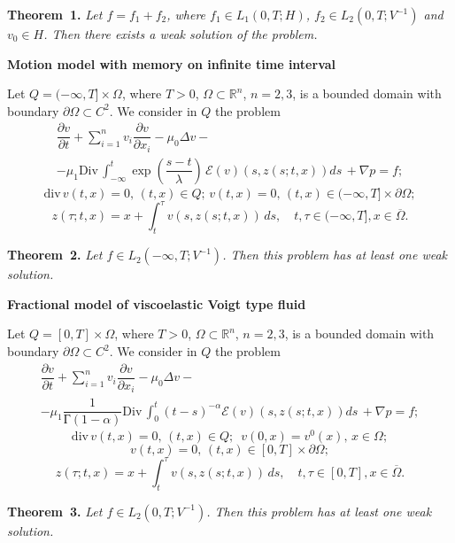 \textbf{Theorem~1.} {\it Let $f=f_{1}+f_2$, where $f_{1}\in L_1(0,T;H)$, $f_{2}\in L_2(0,T;V^{-1})$ and $v_0\in H$. Then
there exists a weak solution of the problem.}

{\bf Motion model with memory on infinite time interval}

Let $ Q=(-\infty, T]\times \Omega$, where $T> 0$, $\Omega \subset \mathbb{R}^n$, $n=2,3$, is a bounded domain with boundary $\partial\Omega \subset C^2$.  We consider in $Q$ the problem
\begin{multline*}\label{1a1}
\dfrac{\partial v}{\partial t}+\sum\limits_{i=1}^n v_i \dfrac{\partial v}{\partial x_i}-\mu_0\Delta v-\\-\mu_1\mathrm{Div}\,\int_{-\infty}^t\exp{(\dfrac{s-t}{\lambda})}\,\mathcal{E}(v)(s, z(s; t, x))ds\,
+ \nabla p=f;
\end{multline*}
\begin{equation*}\label{3a1}
\mathrm{div}\,v(t, x)=0, \, (t, x)\in Q;\, v(t, x)=0, \, (t, x)\in (-\infty, T]\times \partial\Omega;
\end{equation*}
\begin{equation*}\label{4a1}
z(\tau; t, x)=x+\int_t^\tau v(s, z(s;t, x))\,ds, \quad t,\tau \in (-\infty, T], x\in \overline{\Omega}.
\end{equation*}


\textbf{Theorem~2.} {\it Let $f\in L_2(-\infty,T;V^{-1})$. Then this problem has at least one weak solution.}

{\bf Fractional model of viscoelastic Voigt type fluid}

Let $ Q=[0, T]\times \Omega$, where $T> 0$, $\Omega \subset \mathbb{R}^n$, $n=2,3$, is a bounded domain with boundary $\partial\Omega \subset C^2$.  We consider in $Q$ the problem
\begin{multline*}\label{1a2}
\dfrac{\partial v}{\partial t}+\sum\limits_{i=1}^n v_i \dfrac{\partial v}{\partial x_i}-\mu_0\Delta v-\\-\mu_1\dfrac{1}{\mbox{Г}(1-\alpha)}\mathrm{Div}\,\int_{0}^t(t-s)^{-\alpha}\mathcal{E}(v)(s, z(s; t, x))ds\,
+ \nabla p=f;
\end{multline*}
\begin{equation*}\label{3a2}
\mathrm{div}\,v(t, x)=0, \, (t, x)\in Q;\,\,\, v(0,x)=v^0(x), \, x\in \Omega;
 \end{equation*}
\begin{equation*}
 v(t, x)=0, \, (t, x)\in [0, T]\times \partial\Omega;
\end{equation*}
\begin{equation*}\label{4a2}
z(\tau; t, x)=x+\int_t^\tau v(s, z(s;t, x))\,ds, \quad t,\tau \in [0, T], x\in \overline{\Omega}.
\end{equation*}

\textbf{Theorem~3.} {\it Let $f\in L_2(0,T;V^{-1})$. Then this problem has at least one weak solution.}
